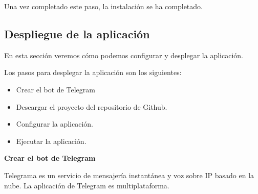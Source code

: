 \vspace{-0.5cm}

Una vez completado este paso, la instalación se ha completado.

\subsection{Despliegue de la aplicación}

En esta sección veremos cómo podemos configurar y desplegar la aplicación.

Los pasos para desplegar la aplicación son los siguientes:

\vspace{-0.4cm}

\begin{itemize}
\item Crear el bot de Telegram
\item Descargar el proyecto del repositorio de Github.
\item Configurar la aplicación.
\item Ejecutar la aplicación.
\end{itemize}

\newpage

\textbf{Crear el bot de Telegram}

Telegrama es un servicio de mensajería instantánea y voz sobre IP basado en la nube. La aplicación de Telegram es multiplataforma.

\vspace{-0.4cm}

